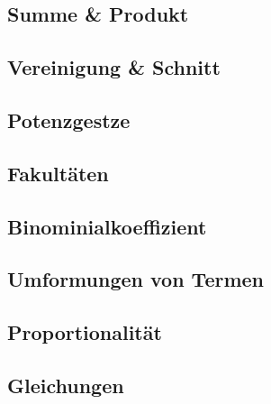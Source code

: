 \subsection{Summe \& Produkt}


\subsection{Vereinigung \& Schnitt}


\subsection{Potenzgestze}


\subsection{Fakultäten}


\subsection{Binominialkoeffizient}


\subsection{Umformungen von Termen}


\subsection{Proportionalität}


\subsection{Gleichungen}


